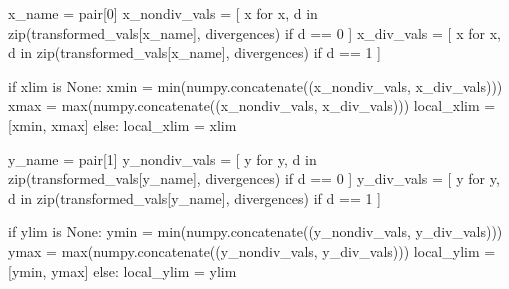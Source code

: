 \documentclass[
  letterpaper,
  DIV=11,
  numbers=noendperiod]{scrartcl}
\newenvironment{Shaded}{\begin{snugshade}}{\end{snugshade}}
\newcommand{\BuiltInTok}[1]{\textcolor[rgb]{0.00,0.23,0.31}{#1}}
\newcommand{\ControlFlowTok}[1]{\textcolor[rgb]{0.00,0.23,0.31}{#1}}
\newcommand{\DecValTok}[1]{\textcolor[rgb]{0.68,0.00,0.00}{#1}}
\newcommand{\KeywordTok}[1]{\textcolor[rgb]{0.00,0.23,0.31}{#1}}
\newcommand{\NormalTok}[1]{\textcolor[rgb]{0.00,0.23,0.31}{#1}}
\newcommand{\OperatorTok}[1]{\textcolor[rgb]{0.37,0.37,0.37}{#1}}
\newcommand{\VariableTok}[1]{\textcolor[rgb]{0.07,0.07,0.07}{#1}}
\begin{document}
\begin{Shaded}
\begin{Highlighting}[]
\NormalTok{    x\_name }\OperatorTok{=}\NormalTok{ pair[}\DecValTok{0}\NormalTok{]}
\NormalTok{    x\_nondiv\_vals }\OperatorTok{=}\NormalTok{ [ x }\ControlFlowTok{for}\NormalTok{ x, d }\KeywordTok{in}
                      \BuiltInTok{zip}\NormalTok{(transformed\_vals[x\_name], divergences)}
                      \ControlFlowTok{if}\NormalTok{ d }\OperatorTok{==} \DecValTok{0}\NormalTok{  ]}
\NormalTok{    x\_div\_vals    }\OperatorTok{=}\NormalTok{ [ x }\ControlFlowTok{for}\NormalTok{ x, d }\KeywordTok{in}
                      \BuiltInTok{zip}\NormalTok{(transformed\_vals[x\_name], divergences)}
                      \ControlFlowTok{if}\NormalTok{ d }\OperatorTok{==} \DecValTok{1}\NormalTok{  ]}
    
    \ControlFlowTok{if}\NormalTok{ xlim }\KeywordTok{is} \VariableTok{None}\NormalTok{:}
\NormalTok{      xmin }\OperatorTok{=} \BuiltInTok{min}\NormalTok{(numpy.concatenate((x\_nondiv\_vals, x\_div\_vals)))}
\NormalTok{      xmax }\OperatorTok{=} \BuiltInTok{max}\NormalTok{(numpy.concatenate((x\_nondiv\_vals, x\_div\_vals)))}
\NormalTok{      local\_xlim }\OperatorTok{=}\NormalTok{ [xmin, xmax]}
    \ControlFlowTok{else}\NormalTok{:}
\NormalTok{      local\_xlim }\OperatorTok{=}\NormalTok{ xlim}
    
\NormalTok{    y\_name }\OperatorTok{=}\NormalTok{ pair[}\DecValTok{1}\NormalTok{]}
\NormalTok{    y\_nondiv\_vals }\OperatorTok{=}\NormalTok{ [ y }\ControlFlowTok{for}\NormalTok{ y, d }\KeywordTok{in}
                      \BuiltInTok{zip}\NormalTok{(transformed\_vals[y\_name], divergences)}
                      \ControlFlowTok{if}\NormalTok{ d }\OperatorTok{==} \DecValTok{0}\NormalTok{  ]}
\NormalTok{    y\_div\_vals    }\OperatorTok{=}\NormalTok{ [ y }\ControlFlowTok{for}\NormalTok{ y, d }\KeywordTok{in}
                      \BuiltInTok{zip}\NormalTok{(transformed\_vals[y\_name], divergences)}
                      \ControlFlowTok{if}\NormalTok{ d }\OperatorTok{==} \DecValTok{1}\NormalTok{  ]}
    
    \ControlFlowTok{if}\NormalTok{ ylim }\KeywordTok{is} \VariableTok{None}\NormalTok{:}
\NormalTok{      ymin }\OperatorTok{=} \BuiltInTok{min}\NormalTok{(numpy.concatenate((y\_nondiv\_vals, y\_div\_vals)))}
\NormalTok{      ymax }\OperatorTok{=} \BuiltInTok{max}\NormalTok{(numpy.concatenate((y\_nondiv\_vals, y\_div\_vals)))}
\NormalTok{      local\_ylim }\OperatorTok{=}\NormalTok{ [ymin, ymax]}
    \ControlFlowTok{else}\NormalTok{:}
\NormalTok{      local\_ylim }\OperatorTok{=}\NormalTok{ ylim}
     

\end{Highlighting}
\end{Shaded}
\end{document}
